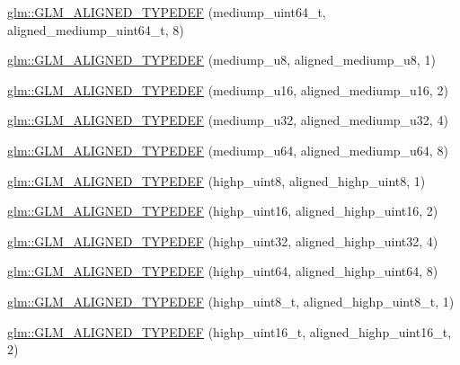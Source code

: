 \begin{DoxyCompactItemize}
\item 
\hyperlink{group__gtx__type__aligned_gad14a0f2ec93519682b73d70b8e401d81}{glm\-::\-G\-L\-M\-\_\-\-A\-L\-I\-G\-N\-E\-D\-\_\-\-T\-Y\-P\-E\-D\-E\-F} (mediump\-\_\-uint64\-\_\-t, aligned\-\_\-mediump\-\_\-uint64\-\_\-t, 8)
\item 
\hyperlink{group__gtx__type__aligned_gada8b996eb6526dc1ead813bd49539d1b}{glm\-::\-G\-L\-M\-\_\-\-A\-L\-I\-G\-N\-E\-D\-\_\-\-T\-Y\-P\-E\-D\-E\-F} (mediump\-\_\-u8, aligned\-\_\-mediump\-\_\-u8, 1)
\item 
\hyperlink{group__gtx__type__aligned_ga28948f6bfb52b42deb9d73ae1ea8d8b0}{glm\-::\-G\-L\-M\-\_\-\-A\-L\-I\-G\-N\-E\-D\-\_\-\-T\-Y\-P\-E\-D\-E\-F} (mediump\-\_\-u16, aligned\-\_\-mediump\-\_\-u16, 2)
\item 
\hyperlink{group__gtx__type__aligned_gad6a7c0b5630f89d3f1c5b4ef2919bb4c}{glm\-::\-G\-L\-M\-\_\-\-A\-L\-I\-G\-N\-E\-D\-\_\-\-T\-Y\-P\-E\-D\-E\-F} (mediump\-\_\-u32, aligned\-\_\-mediump\-\_\-u32, 4)
\item 
\hyperlink{group__gtx__type__aligned_gaa0fc531cbaa972ac3a0b86d21ef4a7fa}{glm\-::\-G\-L\-M\-\_\-\-A\-L\-I\-G\-N\-E\-D\-\_\-\-T\-Y\-P\-E\-D\-E\-F} (mediump\-\_\-u64, aligned\-\_\-mediump\-\_\-u64, 8)
\item 
\hyperlink{group__gtx__type__aligned_ga0ee829f7b754b262bbfe6317c0d678ac}{glm\-::\-G\-L\-M\-\_\-\-A\-L\-I\-G\-N\-E\-D\-\_\-\-T\-Y\-P\-E\-D\-E\-F} (highp\-\_\-uint8, aligned\-\_\-highp\-\_\-uint8, 1)
\item 
\hyperlink{group__gtx__type__aligned_ga447848a817a626cae08cedc9778b331c}{glm\-::\-G\-L\-M\-\_\-\-A\-L\-I\-G\-N\-E\-D\-\_\-\-T\-Y\-P\-E\-D\-E\-F} (highp\-\_\-uint16, aligned\-\_\-highp\-\_\-uint16, 2)
\item 
\hyperlink{group__gtx__type__aligned_ga6027ae13b2734f542a6e7beee11b8820}{glm\-::\-G\-L\-M\-\_\-\-A\-L\-I\-G\-N\-E\-D\-\_\-\-T\-Y\-P\-E\-D\-E\-F} (highp\-\_\-uint32, aligned\-\_\-highp\-\_\-uint32, 4)
\item 
\hyperlink{group__gtx__type__aligned_ga2aca46c8608c95ef991ee4c332acde5f}{glm\-::\-G\-L\-M\-\_\-\-A\-L\-I\-G\-N\-E\-D\-\_\-\-T\-Y\-P\-E\-D\-E\-F} (highp\-\_\-uint64, aligned\-\_\-highp\-\_\-uint64, 8)
\item 
\hyperlink{group__gtx__type__aligned_gaff50b10dd1c48be324fdaffd18e2c7ea}{glm\-::\-G\-L\-M\-\_\-\-A\-L\-I\-G\-N\-E\-D\-\_\-\-T\-Y\-P\-E\-D\-E\-F} (highp\-\_\-uint8\-\_\-t, aligned\-\_\-highp\-\_\-uint8\-\_\-t, 1)
\item 
\hyperlink{group__gtx__type__aligned_ga9fc4421dbb833d5461e6d4e59dcfde55}{glm\-::\-G\-L\-M\-\_\-\-A\-L\-I\-G\-N\-E\-D\-\_\-\-T\-Y\-P\-E\-D\-E\-F} (highp\-\_\-uint16\-\_\-t, aligned\-\_\-highp\-\_\-uint16\-\_\-t, 2)

\end{DoxyCompactItemize}
